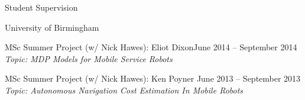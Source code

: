 \begin{rSection}{Student Supervision}
\begin{rSubsection}{University of Birmingham}{}{}{}
\item MSc Summer Project (w/ Nick Hawes): Eliot Dixon\hfill June 2014 -- September 2014\\
\textit{Topic: MDP Models for Mobile Service Robots}

\item MSc Summer Project (w/ Nick Hawes): Ken Poyner \hfill June 	2013 -- September 2013\\
\textit{Topic: Autonomous Navigation Cost Estimation In Mobile Robots}

\end{rSubsection}

\end{rSection}
